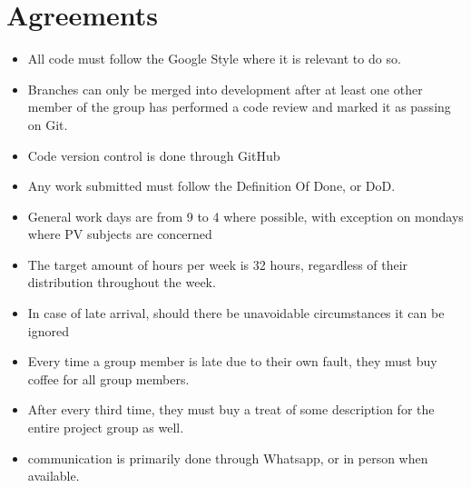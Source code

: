 \section{Agreements}
\begin{itemize}
	\item All code must follow the Google Style where it is relevant to do so.
	\item Branches can only be merged into development after at least one other member of the group has performed a code review and marked it as passing on Git.
	\item Code version control is done through GitHub
	\item Any work submitted must follow the Definition Of Done, or DoD.
\item General work days are from 9 to 4 where possible, with exception on mondays where PV subjects are concerned
\item The target amount of hours per week is 32 hours, regardless of their distribution throughout the week.
\item In case of late arrival, should there be unavoidable circumstances it can be ignored
\item Every time a group member is late due to their own fault, they must buy coffee for all group members.
\item After every third time, they must buy a treat of some description for the entire project group as well.
\item communication is primarily done through Whatsapp, or in person when available.
\end{itemize}
\newpage

